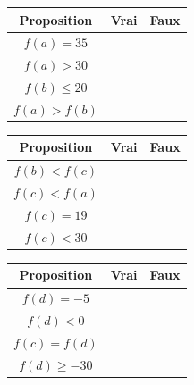 {	\begin{center}
\def\arraystretch{1.5}
\setlength\tabcolsep{6pt}
	\begin{tabular}{|c|c|c|} \hline
		Proposition & Vrai & Faux \\ \hline
		$f(a) = 35$ & & \checkmark \\ \hline
		$f(a) > 30$ & \checkmark & \\ \hline
		$f(b) \leq 20$ & \checkmark & \\ \hline
		$f(a) > f(b)$ & \checkmark & \\ \hline
	\end{tabular}	
	\hfill
	\begin{tabular}{|c|c|c|} \hline
		Proposition & Vrai & Faux \\ \hline
		$f(b) < f(c)$ & \checkmark & \\ \hline
		$f(c) < f(a)$ & \checkmark & \\ \hline
		$f(c) = 19$ & & \checkmark \\ \hline
		$f(c) < 30$ & \checkmark & \\ \hline
	\end{tabular}
	\hfill
	\begin{tabular}{|c|c|c|} \hline
		Proposition & Vrai & Faux \\ \hline
		$f(d) = -5$ & & \checkmark \\ \hline
		$f(d) < 0$ & & \checkmark \\ \hline
		$f(c) = f(d)$ & & \checkmark \\ \hline
		$f(d) \geq -30$ & \checkmark & \\ \hline
	\end{tabular}	
	\end{center}
}


